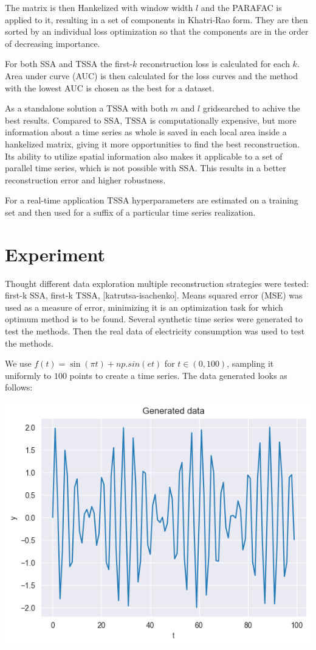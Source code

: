 \documentclass{article}
\begin{document}
The matrix is then Hankelized with window width \(l\) and the PARAFAC is applied to it, resulting in a set of components in Khatri-Rao form. They are then sorted by an individual loss optimization so that the components are in the order of decreasing importance.

For both SSA and TSSA the first-\(k\) reconstruction loss is calculated for each \(k\). Area under curve (AUC) is then calculated for the loss curves and the method with the lowest AUC is chosen as the best for a dataset.

As a standalone solution a TSSA with both \(m\) and \(l\) gridsearched to achive the best results. Compared to SSA, TSSA is computationally expensive, but more information about a time series as whole is saved in each local area inside a hankelized matrix, giving it more opportunities to find the best reconstruction. Its ability to utilize spatial information also makes it applicable to a set of parallel time series, which is not possible with SSA. This results in a better reconstruction error and higher robustness.

For a real-time application TSSA hyperparameters are estimated on a training set and then used for a suffix of a particular time series realization.

\section{Experiment}

Thought different data exploration multiple reconstruction strategies were tested: first-k SSA, first-k TSSA, [katrutsa-isachenko]. Means squared error (MSE) was used as a measure of error, minimizing it is an optimization task for which optimum method is to be found. Several synthetic time series were generated to test the methods. Then the real data of electricity consumption was used to test the methods.

We use \(f(t) = \sin(\pi t) + np.sin(et)\) for \(t \in (0, 100)\), sampling it uniformly to \(100\) points to create a time series. The data generated looks as follows:

\includegraphics[scale=0.7]{./images/fig1.png}
\end{document}
